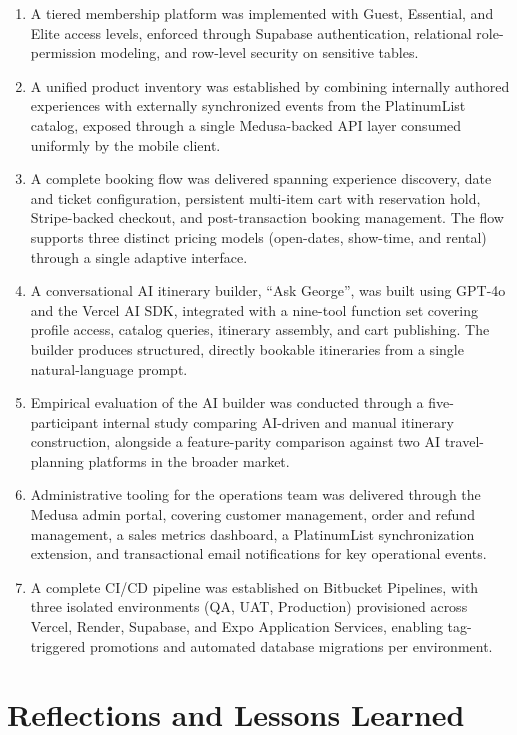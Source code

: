 \begin{enumerate}
  \item A tiered membership platform was implemented with Guest, Essential, and Elite access levels, enforced through Supabase authentication, relational role-permission modeling, and row-level security on sensitive tables.
  \item A unified product inventory was established by combining internally authored experiences with externally synchronized events from the PlatinumList catalog, exposed through a single Medusa-backed API layer consumed uniformly by the mobile client.
  \item A complete booking flow was delivered spanning experience discovery, date and ticket configuration, persistent multi-item cart with reservation hold, Stripe-backed checkout, and post-transaction booking management. The flow supports three distinct pricing models (open-dates, show-time, and rental) through a single adaptive interface.
  \item A conversational AI itinerary builder, ``Ask George'', was built using GPT-4o and the Vercel AI SDK, integrated with a nine-tool function set covering profile access, catalog queries, itinerary assembly, and cart publishing. The builder produces structured, directly bookable itineraries from a single natural-language prompt.
  \item Empirical evaluation of the AI builder was conducted through a five-participant internal study comparing AI-driven and manual itinerary construction, alongside a feature-parity comparison against two AI travel-planning platforms in the broader market.
  \item Administrative tooling for the operations team was delivered through the Medusa admin portal, covering customer management, order and refund management, a sales metrics dashboard, a PlatinumList synchronization extension, and transactional email notifications for key operational events.
  \item A complete CI/CD pipeline was established on Bitbucket Pipelines, with three isolated environments (QA, UAT, Production) provisioned across Vercel, Render, Supabase, and Expo Application Services, enabling tag-triggered promotions and automated database migrations per environment.
\end{enumerate}

\section{Reflections and Lessons Learned}

